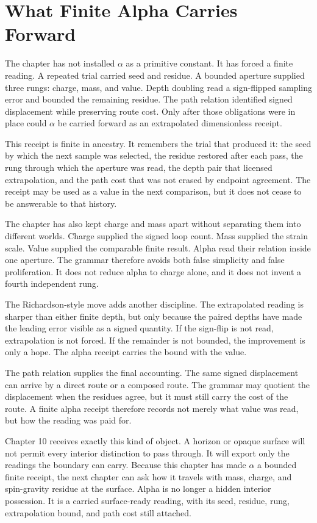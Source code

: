 \section{What Finite Alpha Carries Forward}

The chapter has not installed \(\alpha\) as a primitive constant. It has
forced a finite reading. A repeated trial carried seed and residue. A bounded
aperture supplied three rungs: charge, mass, and value. Depth doubling read a
sign-flipped sampling error and bounded the remaining residue. The path
relation identified signed displacement while preserving route cost. Only
after those obligations were in place could \(\alpha\) be carried forward as
an extrapolated dimensionless receipt.

This receipt is finite in ancestry. It remembers the trial that produced it:
the seed by which the next sample was selected, the residue restored after
each pass, the rung through which the aperture was read, the depth pair that
licensed extrapolation, and the path cost that was not erased by endpoint
agreement. The receipt may be used as a value in the next comparison, but it
does not cease to be answerable to that history.

The chapter has also kept charge and mass apart without separating them into
different worlds. Charge supplied the signed loop count. Mass supplied the
strain scale. Value supplied the comparable finite result. Alpha read their
relation inside one aperture. The grammar therefore avoids both false
simplicity and false proliferation. It does not reduce alpha to charge alone,
and it does not invent a fourth independent rung.

The Richardson-style move adds another discipline. The extrapolated reading
is sharper than either finite depth, but only because the paired depths have
made the leading error visible as a signed quantity. If the sign-flip is not
read, extrapolation is not forced. If the remainder is not bounded, the
improvement is only a hope. The alpha receipt carries the bound with the
value.

The path relation supplies the final accounting. The same signed displacement
can arrive by a direct route or a composed route. The grammar may quotient
the displacement when the residues agree, but it must still carry the cost
of the route. A finite alpha receipt therefore records not merely what value
was read, but how the reading was paid for.

Chapter 10 receives exactly this kind of object. A horizon or opaque surface
will not permit every interior distinction to pass through. It will export
only the readings the boundary can carry. Because this chapter has made
\(\alpha\) a bounded finite receipt, the next chapter can ask how it travels
with mass, charge, and spin-gravity residue at the surface. Alpha is no
longer a hidden interior possession. It is a carried surface-ready reading,
with its seed, residue, rung, extrapolation bound, and path cost still
attached.
